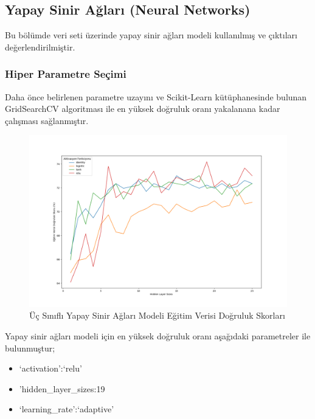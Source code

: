 \documentclass[12pt,twoside]{deuthesis}
\providecommand{\tightlist}{%
  \setlength{\itemsep}{0pt}\setlength{\parskip}{0pt}}
\begin{document}
\hypertarget{mult_nn}{%
\subsection{Yapay Sinir Ağları (Neural Networks)}\label{mult_nn}}

Bu bölümde veri seti üzerinde yapay sinir ağları modeli kullanılmış ve çıktıları değerlendirilmiştir.

\hypertarget{hiper-parametre-seuxe7imi-3}{%
\subsubsection{Hiper Parametre Seçimi}\label{hiper-parametre-seuxe7imi-3}}

Daha önce belirlenen parametre uzayını ve Scikit-Learn kütüphanesinde bulunan GridSearchCV algoritması ile en yüksek doğruluk oranı yakalanana kadar çalışması sağlanmıştır.
\begin{figure}

{\centering \includegraphics[width=1.1\linewidth,height=0.5\textheight]{figure/NN_Grid_Graph} 

}

\caption{Üç Sınıflı Yapay Sinir Ağları Modeli Eğitim Verisi Doğruluk Skorları}\label{fig:unnamed-chunk-43}
\end{figure}
Yapay sinir ağları modeli için en yüksek doğruluk oranı aşağıdaki parametreler ile bulunmuştur;
\begin{itemize}
\tightlist
\item
  `activation':`relu'
\item
  'hidden\_layer\_sizes:19
\item
  `learning\_rate':`adaptive'
\end{itemize}
\newpage
\end{document}
